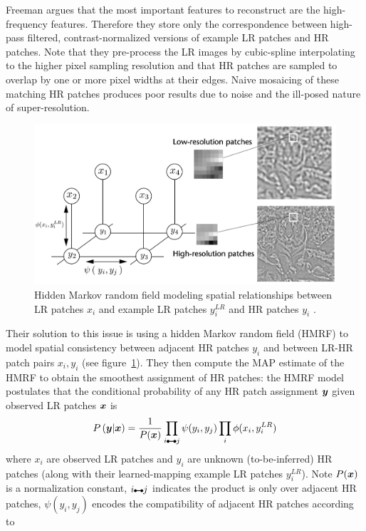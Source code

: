 Freeman \etal \cite{freeman2002example} argues that the most important features to reconstruct are the high-frequency features.
%
Therefore they store only the correspondence between high-pass filtered, contrast-normalized versions of example LR patches and HR patches.
%
Note that they pre-process the LR images by cubic-spline interpolating to the higher pixel sampling resolution and that HR patches are sampled to overlap by one or more pixel widths at their edges.
%
Naive mosaicing of these matching HR patches produces poor results due to noise and the ill-posed nature of super-resolution.
%
\begin{figure}
    \centering
    \includegraphics[width=\linewidth,keepaspectratio]{figures/classical/mrf.png}
    \caption{Hidden Markov random field modeling spatial relationships between LR patches \(x_i\) and example LR patches \(y_i^{LR}\) and HR patches \(y_i\) \cite{freeman2002example}.}
    \label{fig:mrf}
\end{figure}
Their solution to this issue is using a hidden Markov random field (HMRF) to model spatial consistency between adjacent HR patches \(y_i\) and between LR-HR patch pairs \(x_i, y_i\) (see figure~\ref{fig:mrf}).
%
They then compute the MAP estimate of the HMRF to obtain the smoothest assignment of HR patches: the HMRF model postulates that the conditional probability of any HR patch assignment \(\bm{y}\) given observed LR patches \(\bm{x}\) is
\begin{equation}
    P\left( \by \middle| \bx \right) = \frac{1}{P(\bx)} \prod_{i\ue{} j} \psi(y_i, y_j) \prod_i \phi(x_i, y_i^{LR})
\end{equation}
where \(x_i\) are observed LR patches and \(y_i\) are unknown (to-be-inferred) HR patches (along with their learned-mapping example LR patches \(y_i^{LR}\)).
%
Note \(P(\bm{x})\) is a normalization constant, \(i\ue{} j\) indicates the product is only over adjacent HR patches, \(\psi(y_i, y_j)\) encodes the compatibility of adjacent HR patches according to
